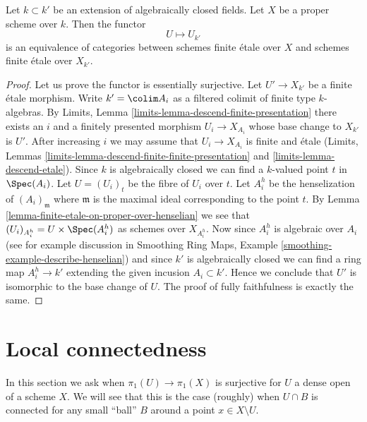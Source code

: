 \begin{lemma}
\label{lemma-finite-etale-invariant-over-proper}
Let $k \subset k'$ be an extension of algebraically closed fields.
Let $X$ be a proper scheme over $k$. Then the functor
$$
U \longmapsto U_{k'}
$$
is an equivalence of categories between schemes finite \'etale over
$X$ and schemes finite \'etale over $X_{k'}$.
\end{lemma}

\begin{proof}
Let us prove the functor is essentially surjective.
Let $U' \to X_{k'}$ be a finite \'etale morphism.
Write $k' = \colim A_i$ as a filtered colimit of finite type $k$-algebras.
By Limits, Lemma \ref{limits-lemma-descend-finite-presentation}
there exists an $i$ and a finitely presented morphism $U_i \to X_{A_i}$
whose base change to $X_{k'}$ is $U'$. After increasing $i$
we may assume that $U_i \to X_{A_i}$ is finite and \'etale
(Limits, Lemmas \ref{limits-lemma-descend-finite-finite-presentation} and
\ref{limits-lemma-descend-etale}).
Since $k$ is algebraically closed we can find a
$k$-valued point $t$ in $\Spec(A_i)$. Let $U = (U_i)_t$ be the
fibre of $U_i$ over $t$. Let $A_i^h$ be the
henselization of $(A_i)_{\mathfrak m}$ where $\mathfrak m$ is
the maximal ideal corresponding to the point $t$. By
Lemma \ref{lemma-finite-etale-on-proper-over-henselian}
we see that $(U_i)_{A_i^h} = U \times \Spec(A_i^h)$ as schemes
over $X_{A_i^h}$. Now since
$A_i^h$ is algebraic over $A_i$ (see for example discussion in
Smoothing Ring Maps, Example \ref{smoothing-example-describe-henselian})
and since $k'$ is algebraically closed
we can find a ring map $A_i^h \to k'$ extending the given
incusion $A_i \subset k'$. Hence we conclude that $U'$
is isomorphic to the base change of $U$.
The proof of fully faithfulness is exactly the same.
\end{proof}








\section{Local connectedness}
\label{section-unibranch}

\noindent
In this section we ask when $\pi_1(U) \to \pi_1(X)$ is surjective
for $U$ a dense open of a scheme $X$. We will see that this is the
case (roughly) when $U \cap B$ is connected for any small
``ball'' $B$ around a point $x \in X \setminus U$.

